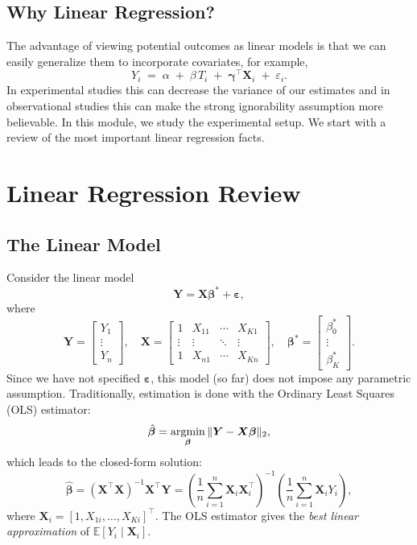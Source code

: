 \documentclass[11pt]{exam}
\theoremstyle{plain}
\newcommand{\argmin}{\operatornamewithlimits{argmin}}
\newcommand{\E}{\mathbb{E}}
\newcommand{\bX}{\bm{X}}
\newcommand{\bY}{\bm{Y}}
\begin{document}
\subsection{Why Linear Regression?}
The advantage of viewing potential outcomes as linear models is that we can easily generalize them to incorporate covariates, for example,
\[
Y_i \;=\; \alpha \;+\; \beta\,T_i \;+\; \bm{\gamma}^\top \bX_i \;+\; \varepsilon_i.
\]
In experimental studies this can decrease the variance of our estimates and in observational studies this can make the strong ignorability assumption more believable. In this module, we study the experimental setup. We start with a review of the most important linear regression facts.

\section{Linear Regression Review}
\subsection{The Linear Model}
Consider the linear model
\[
    \bY = \bX \bm{\beta}^\ast + \bm{\varepsilon},
\]
where
  \[
  \bY =
  \begin{bmatrix}
  Y_1 \\ \vdots \\ Y_n
  \end{bmatrix}, \quad
  \bX =
  \begin{bmatrix}
  1 & X_{11} & \cdots & X_{K1} \\
  \vdots & \vdots & \ddots & \vdots \\
  1 & X_{n1} & \cdots & X_{Kn}
  \end{bmatrix}, \quad
  \bm{\beta}^\ast =
  \begin{bmatrix}
  \beta^\ast_0 \\ \vdots \\ \beta^\ast_K
  \end{bmatrix}.
\]
Since we have not specified $\bm{\varepsilon}$, this model (so far) does not impose any parametric assumption. Traditionally, estimation is done with the Ordinary Least Squares (OLS) estimator:
\[
    \hat{\bm{\beta}} = \argmin_{\bm{\beta}} \|\bY - \bX \bm{\beta}\|_2,
  \]
  which leads to the closed-form solution:
  \[
    \hat{\bm{\beta}} = (\bX^\top \bX)^{-1} \bX^\top \bY
    = \left(\frac{1}{n}\sum_{i=1}^n \bX_i \bX_i^\top\right)^{-1}
      \left(\frac{1}{n}\sum_{i=1}^n \bX_i Y_i\right),
  \]
  where $\bX_i = [1, X_{1i}, \ldots, X_{Ki}]^\top$.
The OLS estimator gives the \emph{best linear approximation} of $\E[Y_i \mid \bX_i]$.
\end{document}
